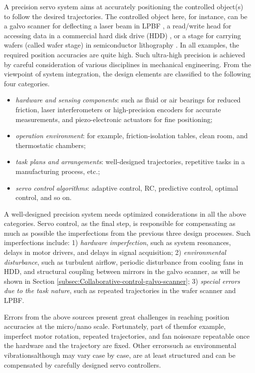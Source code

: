 \documentclass [11pt, proquest] {uwthesis}[2020/02/24]
\begin{document}
A precision servo system aims at accurately positioning the controlled
object(s) to follow the desired trajectories. The controlled object
here, for instance, can be a galvo scanner for deflecting
a laser beam in LPBF \cite{wang2016spectral}, a read/write head for accessing data in
a commercial hard disk drive (HDD) \cite{atsumi2014compensating},
or a stage for carrying wafers (called wafer stage) in semiconductor
lithography \cite{oomen2014connecting}. In all examples, the required position accuracies
are quite high. Such ultra-high precision is achieved by careful
consideration of various disciplines in mechanical engineering. From
the viewpoint of system integration, the design elements are classified
to the following four categories.
\begin{itemize}
\item \emph{hardware and sensing components}: such as fluid or air bearings
for reduced friction, laser interferometers or high-precision encoders
for accurate measurements, and piezo-electronic actuators for fine
positioning;
\item \emph{operation environment}: for example, friction-isolation tables,
clean room, and thermostatic chambers;
\item \emph{task plans and arrangements}: well-designed trajectories, repetitive
tasks in a manufacturing process, etc.;
\item \emph{servo control algorithms}: adaptive control, RC,
predictive control, optimal control, and so on.
\end{itemize}
A well-designed precision system needs optimized considerations in
all the above categories. Servo control, as the final step, is responsible
for compensating as much as possible the imperfections from the previous
three design processes. Such imperfections include:\emph{ }1)\emph{
hardware imperfection}, such as system resonances, delays in motor
drivers, and delays in signal acquisition; 2)\emph{ environmental
disturbance}, such as turbulent airflow, periodic disturbance from
cooling fans in HDD, and structural coupling between mirrors in the
galvo scanner, as will be shown in Section \ref{subsec:Collaborative-control-galvo-scanner}; 3)\emph{ special errors due to the task nature}, such
as repeated trajectories in the wafer scanner and LPBF.

Errors from the above sources present great challenges in reaching
position accuracies at the micro/nano scale. Fortunately, part of
them\textemdash for example, imperfect motor rotation, repeated trajectories,
and fan noises\textemdash are repeatable once the hardware and the
trajectory are fixed. Other errors\textemdash such as environmental
vibrations\textemdash although may vary case by case, are at least
structured and can be compensated by carefully designed servo controllers. 
\end{document}
